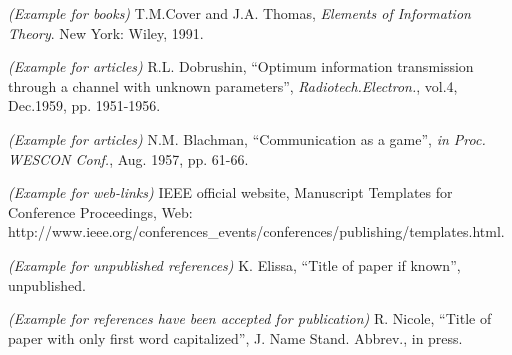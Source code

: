 
\begin{thebibliography}{6}

\textit{(Example for books)} T.M.Cover and J.A. Thomas, \emph{Elements of Information Theory}. New York: Wiley, 1991.

\textit{(Example for articles)} R.L. Dobrushin, ``Optimum information transmission through a channel with unknown parameters'',  \emph{Radiotech.Electron.}, vol.4, Dec.1959, pp. 1951-1956.

\textit{(Example for articles)} N.M. Blachman, ``Communication as a game'', \emph{in Proc. WESCON Conf.}, Aug. 1957, pp. 61-66.

\textit{(Example for web-links)} IEEE official website, Manuscript Templates for Conference Proceedings, Web: http://www.ieee.org/conferences\_events/conferences/publishing/templates.\newline html.

\textit{(Example for unpublished references)} K. Elissa, ``Title of paper if known'', unpublished.

\textit{(Example for references have been accepted for publication)} R. Nicole, ``Title of paper with only first word capitalized'', J. Name Stand. Abbrev., in press.

\end{thebibliography}